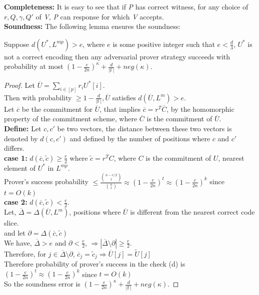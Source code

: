 \documentclass[runningheads]{llncs}
\begin{document}
\textbf{Completeness:} It is easy to see that if \textit{P} has correct witness, for any choice of $r, Q, \gamma, Q'$ of \textit{V}, \textit{P} can response for which \textit{V} accepts.\\

\textbf{Soundness:} The following lemma ensures the soundness:
 \begin{lemma} Suppose $d(U^*,L^{mp})>e$, where $e$ is some positive integer such that $e<\frac{d}{3}$, $U^*$ is not a correct encoding then any adversarial prover strategy succeeds with probability at most $(1-\frac{e}{2n})^{\kappa}+\frac{d}{|\mathbb{F}|}+neg(\kappa)$.
 \end{lemma}
 
 \begin{proof}
 	Let $\overline{U}= \sum\limits_{i\in[p]}r_iU^{*}[i]$.\\
	Then with probability $\geq 1-\frac{d}{|\mathbb{F}|}, \overline{U}$ satisfies $d(\overline{U},L^m)>e$.\\
	Let $\overline{c}$ be the commitment for $\overline{U}$, that implies $\overline{c}=r^T\overline{C}$, by the homomorphic property of the commitment scheme, where $\overline{C}$ is the commitment of $\overline{U}$.\\
	\textbf{Define: } Let $c,c'$ be two vectors, the distance between these two vectors is denoted by $d(c,c')$ and defined by the number of positions where $c$ and $c'$ differs.\\
	\textbf{case 1:} $d(\overline{c},\tilde{c})\geq \frac{e}{2}$ where $\tilde{c}= r^TC$, where $C$ is the commitment of $U$, nearest element of $U^*$ in $L^{mp}$.\\
	Prover's success probability $\leq \frac{\binom{n-e/2}{t}}{\binom{n}{t}}\approx(1-\frac{e}{2n})^t\approx(1-\frac{e}{2n})^k$ since $t=O(k)$\\
	\textbf{case 2:} $d(\overline{c},\tilde{c})< \frac{e}{2}$.\\
	Let, $\overline{\Delta}=\Delta(\overline{U}, L^m)$, positions where $\overline{U}$ is different from the nearest correct code slice.\\
	and let $\partial=\Delta(\overline{c},\tilde{c})$\\
	We have, $\overline{\Delta}>e$ and $\partial<\frac{e}{2}$, 
	$\Rightarrow |\overline{\Delta}\setminus \partial| \geq \frac{e}{2}$.\\
	Therefore, for $j\in \overline{\Delta}\setminus \partial$, $\overline{c}_j=\tilde{c}_j \Rightarrow \overline{U}[j]=\widetilde{U}[j]$\\
	Therefore probability of prover's success in the check (d) is $(1-\frac{e}{2n})^t\approx(1-\frac{e}{2n})^k$ since $t=O(k)$\\
	So the soundness error is $(1-\frac{e}{2n})^{\kappa}+\frac{d}{|\mathbb{F}|}+neg(\kappa)$.
 \end{proof}
 
\end{document}
